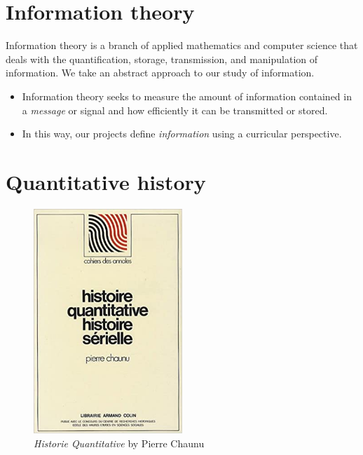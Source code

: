 \documentclass[
  letterpaper,
  DIV=11,
  numbers=noendperiod]{scrartcl}
\begin{document}
\hypertarget{information-theory}{%
\section{Information theory}\label{information-theory}}

Information theory is a branch of applied mathematics and computer
science that deals with the quantification, storage, transmission, and
manipulation of information. We take an abstract approach to our study
of information.

\begin{itemize}
\item
  Information theory seeks to measure the amount of information
  contained in a \emph{message} or signal and how efficiently it can be
  transmitted or stored.
\item
  In this way, our projects define \emph{information} using a curricular
  perspective.
\end{itemize}

\hypertarget{quantitative-history}{%
\section{Quantitative history}\label{quantitative-history}}

\begin{figure}

{\centering \includegraphics[width=0.5\textwidth,height=\textheight]{quanthist.jpg}

}

\caption{\emph{Historie Quantitative} by Pierre Chaunu}

\end{figure}
\end{document}
